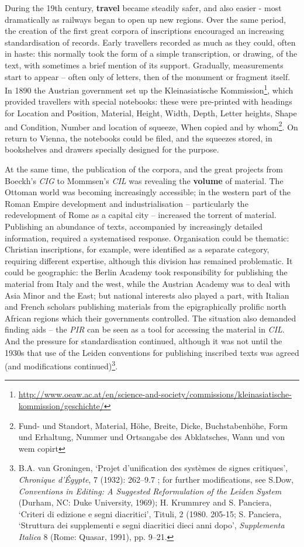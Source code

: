 \documentclass[amsthm,ebook]{saparticle}
\begin{document}
During the 19th century, \textbf{travel} became steadily safer, and also easier 
- most dramatically as railways began to open up new regions. Over the same period, 
the creation of the first great corpora of inscriptions encouraged an increasing 
standardisation of records. Early travellers recorded as much as they could, often 
in haste: this normally took the form of a simple transcription, or drawing, of 
the text, with sometimes a brief mention of its support.  Gradually, measurements 
start to appear – often only of letters, then of the monument or fragment itself. 
In 1890 the Austrian government set up the Kleinasiatische Kommission\footnote{\url{http://www.oeaw.ac.at/en/science-and-society/commissions/kleinasiatische-kommission/geschichte/}}, which provided 
travellers with special notebooks: these were pre-printed with headings for Location 
and Position, Material, Height, Width, Depth, Letter heights, Shape and Condition, 
Number and location of squeeze, When copied and by whom\footnote{Fund- und Standort, Material, Höhe, Breite, Dicke, Buchstabenhöhe, Form und Erhaltung, Nummer und Ortsangabe des Abklatsches, Wann und von wem copirt}. On return to Vienna, the 
notebooks could be filed, and the squeezes stored, in bookshelves and drawers specially 
designed for the purpose.

At the same time, the publication of the corpora, and the great projects from Boeckh's 
\textit{CIG} to  Mommsen's \textit{CIL} was revealing the \textbf{volume} of material. 
 The Ottoman world was becoming increasingly accessible; in the western part of 
the Roman Empire development and industrialisation – particularly the redevelopment 
of Rome as a capital city -- increased the torrent of material. Publishing an abundance 
of texts, accompanied by increasingly detailed information, required a systematised 
response. Organisation could be thematic: Christian inscriptions, for example, 
were identified as a separate category, requiring different expertise, although 
this division has remained problematic. It could be geographic: the Berlin Academy 
took responsibility for publishing the material from Italy and the west, while 
the Austrian Academy was to deal with Asia Minor and the East; but national interests 
also played a part, with Italian and French scholars publishing materials from 
the epigraphically prolific north African regions which their governments controlled. 
The situation also demanded finding aids – the \textit{PIR} can be seen as a 
tool for accessing the material in \textit{CIL}. And the pressure for standardisation 
continued, although it was not until the 1930s that use of the Leiden conventions 
for publishing inscribed texts was agreed (and modifications continued)\footnote{B.A. van Groningen, ‘Projet d’unification des systèmes de signes critiques’, \emph{Chronique d’Égypte}, 7 (1932): 262–9.7 ; for further modifications, see S.Dow, \emph{Conventions in Editing: A Suggested Reformulation of the Leiden System} (Durham, NC: Duke University, 1969); H. Krummrey and S. Panciera, ‘Criteri di edizione e segni diacritici’, Tituli, 2 (1980. 205-15; S. Panciera, ‘Struttura dei supplementi e segni diacritici dieci anni dopo’, \emph{Supplementa Italica} 8 (Rome: Quasar, 1991), pp. 9–21.}. 
\end{document}
